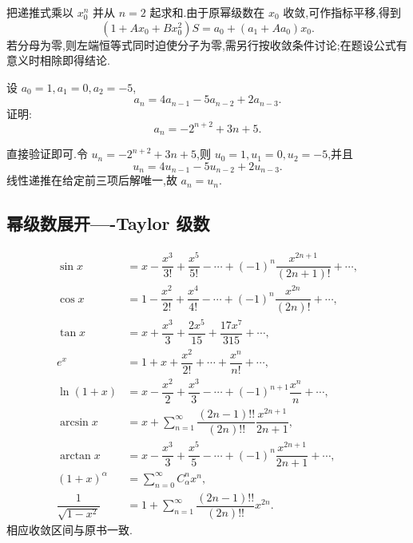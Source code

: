 \begin{solution}
    把递推式乘以 $x_0^n$ 并从 $n=2$ 起求和.由于原幂级数在 $x_0$ 收敛,可作指标平移,得到
    \[
        (1+Ax_0+Bx_0^2)S=a_0+(a_1+Aa_0)x_0.
    \]
    若分母为零,则左端恒等式同时迫使分子为零,需另行按收敛条件讨论;在题设公式有意义时相除即得结论.
\end{solution}

\begin{example}
    设 $a_0=1,a_1=0,a_2=-5$,
    \[
        a_n=4a_{n-1}-5a_{n-2}+2a_{n-3}.
    \]
    证明:
    \[
        a_n=-2^{n+2}+3n+5.
    \]
\end{example}
\exampleblank

\begin{solution}
    直接验证即可.令 $u_n=-2^{n+2}+3n+5$,则
    $u_0=1,u_1=0,u_2=-5$,并且
    \[
        u_n=4u_{n-1}-5u_{n-2}+2u_{n-3}.
    \]
    线性递推在给定前三项后解唯一,故 $a_n=u_n$.
\end{solution}



\subsection{幂级数展开----Taylor 级数}

\begin{theorem}
    \begin{align*}
        \sin x                  & =x-\dfrac{x^3}{3!}+\dfrac{x^5}{5!}-\cdots+(-1)^n\dfrac{x^{2n+1}}{(2n+1)!}+\cdots, \\
        \cos x                  & =1-\dfrac{x^2}{2!}+\dfrac{x^4}{4!}-\cdots+(-1)^n\dfrac{x^{2n}}{(2n)!}+\cdots,     \\
        \tan x                  & =x+\dfrac{x^3}{3}+\dfrac{2x^5}{15}+\dfrac{17x^7}{315}+\cdots,                     \\
        e^x                     & =1+x+\dfrac{x^2}{2!}+\cdots+\dfrac{x^n}{n!}+\cdots,                               \\
        \ln(1+x)                & =x-\dfrac{x^2}{2}+\dfrac{x^3}{3}-\cdots+(-1)^{n+1}\dfrac{x^n}{n}+\cdots,          \\
        \arcsin x               & =x+\sum\limits_{n=1}^{\infty}\dfrac{(2n-1)!!}{(2n)!!}\dfrac{x^{2n+1}}{2n+1},      \\
        \arctan x               & =x-\dfrac{x^3}{3}+\dfrac{x^5}{5}-\cdots+(-1)^n\dfrac{x^{2n+1}}{2n+1}+\cdots,      \\
        (1+x)^\alpha            & =\sum\limits_{n=0}^{\infty}C_{\alpha}^{n}x^n,                                     \\
        \dfrac{1}{\sqrt{1-x^2}} & =1+\sum\limits_{n=1}^{\infty}\dfrac{(2n-1)!!}{(2n)!!}x^{2n}.
    \end{align*}
    相应收敛区间与原书一致.
\end{theorem}


